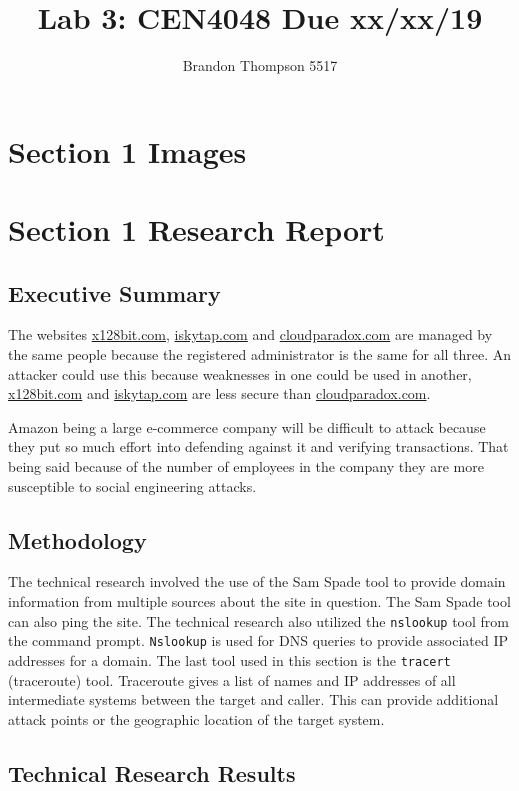\documentclass[a4paper]{article}
\begin{document}
	\title{Lab 3: CEN4048 Due xx/xx/19}
	\author{Brandon Thompson 5517}
	\maketitle
	\medskip
	\section{Section 1 Images}

	\section{Section 1 Research Report}
	\subsection{Executive Summary}
	
	The websites \url{x128bit.com}, \url{iskytap.com} and \url{cloudparadox.com} are
	managed by the same people because the registered administrator is the same for all
	three. An attacker could use this because weaknesses in one could be used in another,
	\url{x128bit.com} and \url{iskytap.com} are less secure than \url{cloudparadox.com}.

	Amazon being a large e-commerce company will be difficult to attack because they put
	so much effort into defending against it and verifying transactions. That being said
	because of the number of employees in the company they are more susceptible to social
	engineering attacks.

	\subsection{Methodology}
	The technical research involved the use of the Sam Spade tool to provide domain information
	from multiple sources about the site in question. The Sam Spade tool can also ping the
	site. The technical research also utilized the \texttt{nslookup} tool from the command
	prompt. \texttt{Nslookup} is used for DNS queries to provide associated IP addresses
	for a domain. The last tool used in this section is the \texttt{tracert} (traceroute) tool.
	Traceroute gives a list of names and IP addresses of all intermediate systems between the
	target and caller. This can provide additional attack points or the geographic location
	of the target system.
	
	\subsection{Technical Research Results}
	
\end{document}
